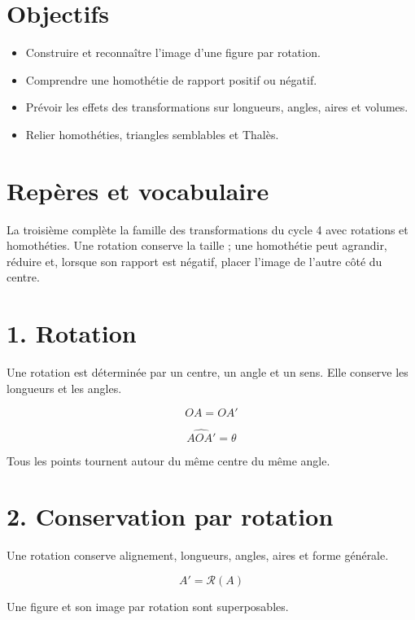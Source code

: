 
\section{Objectifs}
\begin{itemize}
\item Construire et reconnaître l’image d’une figure par rotation.
\item Comprendre une homothétie de rapport positif ou négatif.
\item Prévoir les effets des transformations sur longueurs, angles, aires et volumes.
\item Relier homothéties, triangles semblables et Thalès.
\end{itemize}

\section{Repères et vocabulaire}
La troisième complète la famille des transformations du cycle 4 avec rotations et homothéties. Une rotation conserve la taille ; une homothétie peut agrandir, réduire et, lorsque son rapport est négatif, placer l’image de l’autre côté du centre.

\section{1. Rotation}
Une rotation est déterminée par un centre, un angle et un sens. Elle conserve les longueurs et les angles.

\[
OA=OA'
\]

\[
\widehat{AOA'}=\theta
\]

\begin{exemple}
Tous les points tournent autour du même centre du même angle.
\end{exemple}

\section{2. Conservation par rotation}
Une rotation conserve alignement, longueurs, angles, aires et forme générale.

\[
A'=\mathcal R(A)
\]

\begin{exemple}
Une figure et son image par rotation sont superposables.
\end{exemple}

